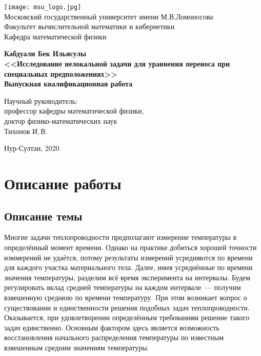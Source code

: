 \documentclass{article}
\theoremstyle{definition}
\begin{document}
	\begin{titlepage}
		\begin{center}
			\texttt{[image: msu\_logo.jpg]}
			\small
			~\\[0.1cm]
			Московский государственный университет имени М.В.Ломоносова
			~\\[0.1cm]
			Факультет вычислительной математики и кибернетики
			~\\[0.1cm]
			Кафедра математической физики
			~\\[1.0cm]
			\normalsize
		\end{center}
	
  	\vspace{1.5cm}
\begin{center}
	\textbf{\large{Кабдуали Бек Ильясулы}}
	\\[2cm]
	\textbf{\large {<<Исследование нелокальной задачи для уравнения переноса при специальных предположениях>>}}
	\\[1.5cm]
	
	\textbf{\large Выпускная квалификационная работа}
	\\[1cm]
	\begin{normalsize}
		\begin{flushright}
			\small
			Научный руководитель:
			\\
			профессор кафедры математической физики,\\ доктор физико-математических наук
			\\
			Тихонов И.\,В.
		\end{flushright}
		\normalsize
	\end{normalsize}
	\vfill 
	
	\small{Нур-Султан, 2020}
\end{center} 

	\end{titlepage}

\newpage

\tableofcontents

\newpage

\section{Описание работы}
\subsection{Описание темы}
Многие задачи теплопроводности предполагают измерение температуры в определённый момент времени.
Однако на практике добиться хорошей точности изммерений не удаётся, потому результаты измерений усредняются по времени для 
каждого участка материального тела. Далее, имея усреднённые по времени значения температуры, разделим всё время эксперимента
на интервалы. Будем регулировать вклад средней температуры на каждом интервале~--- получим взвешенную среднюю по времени температуру. 
При этом возникает вопрос о существовании и единственности решения подобных задач теплопроводности. 
Оказывается, при удовлетворении определённым требованиям решение такого задач единственно. 
Основным фактором здесь является возможность восстановления начального распределения температуры по известным взвешенным средним 
значениям температуры.
\end{document}
